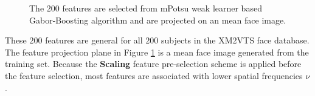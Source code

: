 \begin{figure}[ht]
\begin{center}
  \caption{The $200$ features are selected from mPotsu weak learner based Gabor-Boosting algorithm and are projected on an mean face image.}
  \label{fig:featuresmulti}
 \end{center}
\end{figure} 
These $200$ features are general for all $200$ subjects in the \mbox{XM2VTS} face database. The feature projection plane in \mbox{Figure} \ref{fig:featuresmulti} is a mean face image generated from the training set. Because the \textbf{Scaling} feature pre-selection scheme is applied before the feature selection, most features are associated with lower spatial frequencies $\nu$. %

